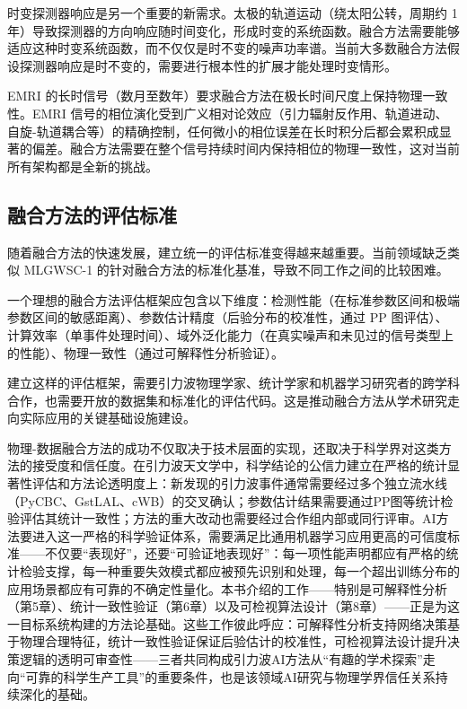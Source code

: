 时变探测器响应是另一个重要的新需求。太极的轨道运动（绕太阳公转，周期约 1 年）导致探测器的方向响应随时间变化，形成时变的系统函数。融合方法需要能够适应这种时变系统函数，而不仅仅是时不变的噪声功率谱。当前大多数融合方法假设探测器响应是时不变的，需要进行根本性的扩展才能处理时变情形。

EMRI 的长时信号（数月至数年）要求融合方法在极长时间尺度上保持物理一致性。EMRI 信号的相位演化受到广义相对论效应（引力辐射反作用、轨道进动、自旋-轨道耦合等）的精确控制，任何微小的相位误差在长时积分后都会累积成显著的偏差。融合方法需要在整个信号持续时间内保持相位的物理一致性，这对当前所有架构都是全新的挑战。

\subsection{融合方法的评估标准}

随着融合方法的快速发展，建立统一的评估标准变得越来越重要。当前领域缺乏类似 MLGWSC-1 的针对融合方法的标准化基准，导致不同工作之间的比较困难。

一个理想的融合方法评估框架应包含以下维度：检测性能（在标准参数区间和极端参数区间的敏感距离）、参数估计精度（后验分布的校准性，通过 PP 图评估）、计算效率（单事件处理时间）、域外泛化能力（在真实噪声和未见过的信号类型上的性能）、物理一致性（通过可解释性分析验证）。

建立这样的评估框架，需要引力波物理学家、统计学家和机器学习研究者的跨学科合作，也需要开放的数据集和标准化的评估代码。这是推动融合方法从学术研究走向实际应用的关键基础设施建设。

物理-数据融合方法的成功不仅取决于技术层面的实现，还取决于科学界对这类方法的接受度和信任度。在引力波天文学中，科学结论的公信力建立在严格的统计显著性评估和方法论透明度上：新发现的引力波事件通常需要经过多个独立流水线（PyCBC、GstLAL、cWB）的交叉确认；参数估计结果需要通过PP图等统计检验评估其统计一致性；方法的重大改动也需要经过合作组内部或同行评审。AI方法要进入这一严格的科学验证体系，需要满足比通用机器学习应用更高的可信度标准——不仅要“表现好”，还要“可验证地表现好”：每一项性能声明都应有严格的统计检验支撑，每一种重要失效模式都应被预先识别和处理，每一个超出训练分布的应用场景都应有可靠的不确定性量化。本书介绍的工作——特别是可解释性分析（第5章）、统计一致性验证（第6章）以及可检视算法设计（第8章）——正是为这一目标系统构建的方法论基础。这些工作彼此呼应：可解释性分析支持网络决策基于物理合理特征，统计一致性验证保证后验估计的校准性，可检视算法设计提升决策逻辑的透明可审查性——三者共同构成引力波AI方法从“有趣的学术探索”走向“可靠的科学生产工具”的重要条件，也是该领域AI研究与物理学界信任关系持续深化的基础。

